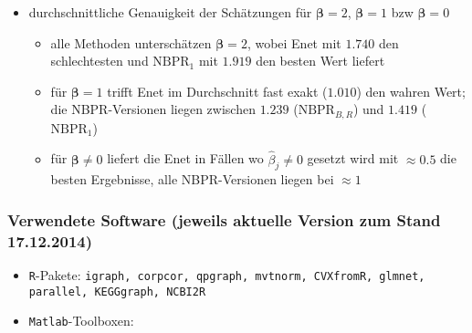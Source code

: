 \documentclass{beamer}
\begin{document}
\begin{frame}
	\begin{itemize}
	\item durchschnittliche Genauigkeit der Schätzungen für $\boldsymbol{\beta} = 2$, $\boldsymbol{\beta} = 1$ bzw $\boldsymbol{\beta} = 0$
	\begin{itemize}
	\item alle Methoden unterschätzen $\boldsymbol{\beta}=2$, wobei Enet mit $1.740$ den schlechtesten und $\text{NBPR}_1$ mit $1.919$ den besten Wert liefert
	\item für $\boldsymbol{\beta} = 1$ trifft Enet im Durchschnitt fast exakt ($1.010$) den wahren Wert; die NBPR-Versionen liegen zwischen $1.239$ ($\text{NBPR}_{B,R}$) und $1.419$ ($\text{NBPR}_1$)  
	\item für $\boldsymbol{\beta}\neq 0$ liefert die Enet in Fällen wo $\hat{\beta}_j \neq 0$ gesetzt wird mit $\approx0.5$ die besten Ergebnisse, alle NBPR-Versionen liegen bei $\approx 1$
	\end{itemize}
	\end{itemize}
\end{frame}


\begin{frame}
	\frametitle{Verwendete Software (jeweils aktuelle Version zum Stand 17.12.2014)}
	\begin{itemize}
	\item \texttt{R}-Pakete: \texttt{igraph, corpcor, qpgraph, mvtnorm, CVXfromR, glmnet, parallel, KEGGgraph, NCBI2R}
	\item \texttt{Matlab}-Toolboxen: 
	\end{itemize}
\end{frame}


%
%


%
\end{document}
